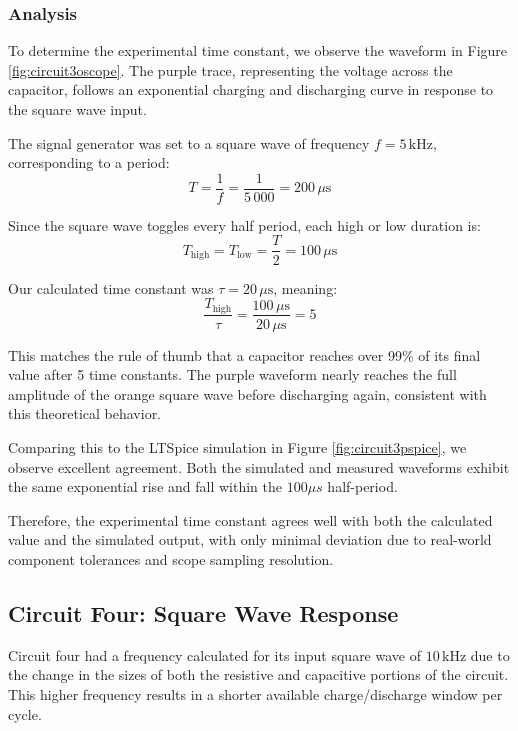 \documentclass[12pt]{article}
\begin{document}
\subsubsection{Analysis}


To determine the experimental time constant, we observe the waveform in Figure \ref{fig:circuit3oscope}. The purple trace, representing the voltage across the capacitor, follows an exponential charging and discharging curve in response to the square wave input.

The signal generator was set to a square wave of frequency $f = 5\,\mathrm{kHz}$, corresponding to a period:
\[
	T = \frac{1}{f} = \frac{1}{5\,000} = 200\,\mu\mathrm{s}
\]

Since the square wave toggles every half period, each high or low duration is:
\[
	T_{\text{high}} = T_{\text{low}} = \frac{T}{2} = 100\,\mu\mathrm{s}
\]

Our calculated time constant was $\tau = 20\,\mu\mathrm{s}$, meaning:
\[
	\frac{T_{\text{high}}}{\tau} = \frac{100\,\mu\mathrm{s}}{20\,\mu\mathrm{s}} = 5
\]

This matches the rule of thumb that a capacitor reaches over 99\% of its final value after 5 time constants. The purple waveform nearly reaches the full amplitude of the orange square wave before discharging again, consistent with this theoretical behavior.

Comparing this to the LTSpice simulation in Figure \ref{fig:circuit3pspice}, we
observe excellent agreement. Both the simulated and measured waveforms exhibit
the same exponential rise and fall within the $100\mu s$ half-period.

Therefore, the experimental time constant agrees well with both the calculated value and the simulated output, with only minimal deviation due to real-world component tolerances and scope sampling resolution.
\subsection{Circuit Four: Square Wave Response}

Circuit four had a frequency calculated for its input square wave of $10\,\mathrm{kHz}$ due
to the change in the sizes of both the resistive and capacitive portions of the
circuit. This higher frequency results in a shorter available charge/discharge window per cycle.
\end{document}
